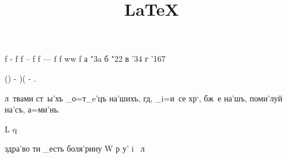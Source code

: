 \documentclass[12pt,a6paper,twoside,dvips,civil=antiqua,cs=irmologion]{hipbook}
\title{\LaTeX}
\begin{document}






\hdrcrosspage
   f - f
   f -- f
   f --- f
   f ww f
   а \char"3a
   б \char"22
   в \char'34
   г \char'167

   () - )(  - .

л~твами ст~ы'хъ _о=т_e'цъ на'шихъ, гд, _i=и~се хр`,
бж~е на'шъ, поми'луй на'съ, а=ми'нь.

   L
   q

   здра'во ти _есть боля'рину
   W\т
   р\с
   у'
   i~
   л\д
\end{document}
